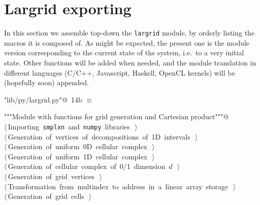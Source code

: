 \documentclass[11pt,oneside]{article}	%
\begin{document}
\section{Largrid exporting}
\label{sec:largrid}
In this section we assemble top-down the \texttt{largrid} module, by orderly listing the macros it is composed of. As might be expected, the present one is the module version corresponding to the current state of the system, i.e.~to a very initial state. Other functions will be added when needed, and the module translation in different languages (C/C++, Javascript, Haskell, OpenCL kernels) will be (hopefully soon) appended.
\begin{flushleft} \small \label{scrap22}
\protect{}\verb@"lib/py/largrid.py"@\nobreak\ {\footnotesize 14b }$\equiv$
\vspace{-1ex}
\begin{list}{}{} \item
\mbox{}\verb@"""Module with functions for grid generation and Cartesian product"""@\\
\mbox{}\verb@@\hbox{$\langle\,$Importing \texttt{smplxn} and \texttt{numpy} libraries\nobreak\ {\footnotesize {}}$\,\rangle$}\verb@@\\
\mbox{}\verb@@\hbox{$\langle\,$Generation of vertices of decompositions of 1D intervals\nobreak\ {\footnotesize {}}$\,\rangle$}\verb@@\\
\mbox{}\verb@@\hbox{$\langle\,$Generation of uniform 0D cellular complex\nobreak\ {\footnotesize {}}$\,\rangle$}\verb@@\\
\mbox{}\verb@@\hbox{$\langle\,$Generation of uniform 1D cellular complex\nobreak\ {\footnotesize {}}$\,\rangle$}\verb@@\\
\mbox{}\verb@@\hbox{$\langle\,$Generation of cellular complex of 0/1 dimension $d$\nobreak\ {\footnotesize {}}$\,\rangle$}\verb@@\\
\mbox{}\verb@@\hbox{$\langle\,$Generation of grid vertices\nobreak\ {\footnotesize {}}$\,\rangle$}\verb@@\\
\mbox{}\verb@@\hbox{$\langle\,$Transformation from multindex to address in a linear array storage\nobreak\ {\footnotesize {}}$\,\rangle$}\verb@@\\
\mbox{}\verb@@\hbox{$\langle\,$Generation of grid cells\nobreak\ {\footnotesize {}}$\,\rangle$}\verb@@\\

\end{list}
\end{flushleft}
\end{document}
